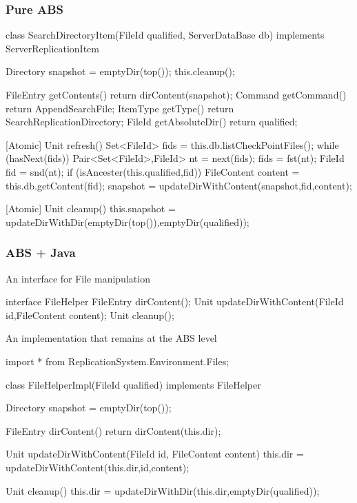 \documentclass[a4paper,11pt,final]{article}
\begin{document}
\subsubsection{Pure ABS}
\begin{absexamplen}
class SearchDirectoryItem(FileId qualified, ServerDataBase db) 
implements ServerReplicationItem {
  Directory snapshot = emptyDir(top());
  { this.cleanup(); }  
	
  FileEntry getContents() { return dirContent(snapshot); }
  Command getCommand() { return AppendSearchFile;	}
  ItemType getType() { return SearchReplicationDirectory; }
  FileId getAbsoluteDir() { return qualified; }
	
  [Atomic] Unit refresh() {
    Set<FileId> fids = this.db.listCheckPointFiles();
    while (hasNext(fids)) {
      Pair<Set<FileId>,FileId> nt = next(fids); fids = fst(nt);
      FileId fid = snd(nt);
      if (isAncester(this.qualified,fid)) {
        FileContent content = this.db.getContent(fid);
        snapshot = updateDirWithContent(snapshot,fid,content);
      }
    }
  }
	
  [Atomic] Unit cleanup() {
    this.snapshot = 
      updateDirWithDir(emptyDir(top()),emptyDir(qualified)); 
  }
}
\end{absexamplen}

\subsubsection{ABS + Java}
An interface for File manipulation
\begin{absexamplen}
interface FileHelper {
  FileEntry dirContent();
  Unit updateDirWithContent(FileId id,FileContent content);
  Unit cleanup();
}
\end{absexamplen}

\noindent An implementation that remains at the ABS level 
\begin{absexamplen}
import * from ReplicationSystem.Environment.Files;

class FileHelperImpl(FileId qualified) implements FileHelper {
  Directory snapshot = emptyDir(top());

  FileEntry dirContent() { return dirContent(this.dir); }
   
  Unit updateDirWithContent(FileId id, FileContent content) {
    this.dir = updateDirWithContent(this.dir,id,content);
  }
                
  Unit cleanup() {
    this.dir = updateDirWithDir(this.dir,emptyDir(qualified)); 
  }
}
\end{absexamplen}
\end{document}
